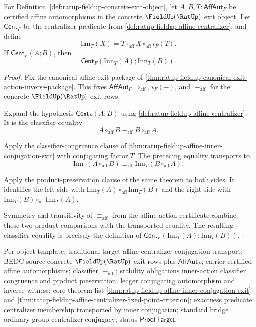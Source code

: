 \begin{theorem}
\label{thm:ratup-fieldup-affine-centralizer-inner-transport}
For Definition~\ref{def:ratup-fieldup-concrete-exit-object}, let
$A,B,T:\mathsf{AffAut}_F$ be certified affine automorphisms in the concrete
$\FieldUp(\RatUp)$ exit object. Let $\mathsf{Cent}_F$ be the centralizer
predicate from \autoref{def:ratup-fieldup-affine-centralizer}, and define
$$
\mathrm{Inn}_T(X)=T\circ_{\mathrm{aff}}X\circ_{\mathrm{aff}}\iota_F(T).
$$
If $\mathsf{Cent}_F(A;B)$, then
$$
\mathsf{Cent}_F(\mathrm{Inn}_T(A);\mathrm{Inn}_T(B)).
$$
\end{theorem}
\begin{proof}
Fix the canonical affine exit package of
\autoref{thm:ratup-fieldup-canonical-exit-action-inverse-package}. This fixes
$\mathsf{AffAut}_F$, $\circ_{\mathrm{aff}}$, $\iota_F(-)$, and
$\equiv_{\mathrm{aff}}$ for the concrete $\FieldUp(\RatUp)$ exit rows.

Expand the hypothesis $\mathsf{Cent}_F(A;B)$ using
\autoref{def:ratup-fieldup-affine-centralizer}. It is the classifier equality
$$
A\circ_{\mathrm{aff}}B\equiv_{\mathrm{aff}}B\circ_{\mathrm{aff}}A.
$$

Apply the classifier-congruence clause of
\autoref{thm:ratup-fieldup-affine-inner-conjugation-exit} with conjugating
factor $T$. The preceding equality transports to
$$
\mathrm{Inn}_T(A\circ_{\mathrm{aff}}B)
\equiv_{\mathrm{aff}}
\mathrm{Inn}_T(B\circ_{\mathrm{aff}}A).
$$

Apply the product-preservation clause of the same theorem to both sides. It
identifies the left side with
$\mathrm{Inn}_T(A)\circ_{\mathrm{aff}}\mathrm{Inn}_T(B)$ and the right side
with $\mathrm{Inn}_T(B)\circ_{\mathrm{aff}}\mathrm{Inn}_T(A)$.

Symmetry and transitivity of $\equiv_{\mathrm{aff}}$ from the affine action
certificate combine these two product comparisons with the transported
equality. The resulting classifier equality is precisely the definition of
$\mathsf{Cent}_F(\mathrm{Inn}_T(A);\mathrm{Inn}_T(B))$.
\end{proof}

Per-object template: traditional target affine centralizer conjugation
transport; BEDC source concrete $\FieldUp(\RatUp)$ exit rows plus
$\mathsf{AffAut}_F$; carrier certified affine automorphisms; classifier
$\equiv_{\mathrm{aff}}$; stability obligations inner-action classifier
congruence and product preservation; ledger conjugating automorphism and
inverse witness; core theorem list
\autoref{thm:ratup-fieldup-affine-inner-conjugation-exit} and
\autoref{thm:ratup-fieldup-affine-centralizer-fixed-point-criterion};
exactness predicate centralizer membership transported by inner conjugation;
standard bridge ordinary group centralizer conjugacy; status
$\mathsf{ProofTarget}$.
